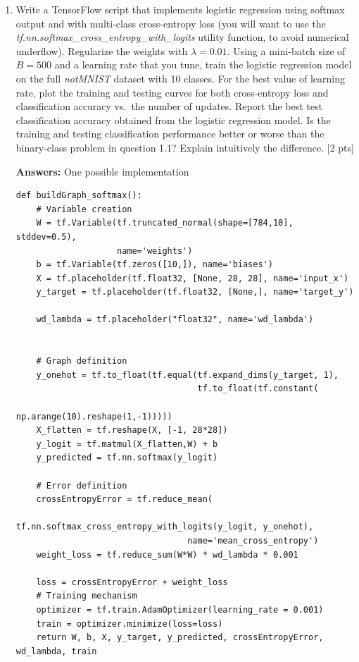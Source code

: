 \documentclass[12pt,letterpaper]{article}
\begin{document}
\begin{enumerate}
\item  Write a TensorFlow script that implements logistic regression using softmax output and with multi-class cross-entropy loss (you will want to use the \textit{tf.nn.softmax\_cross\_entropy\_with\_logits} utility function, to avoid numerical underflow). Regularize the weights with $\lambda = 0.01$. Using a mini-batch size of $B=500$ and a learning rate that you tune, train the logistic regression model on the full \textit{notMNIST} dataset with 10 classes. For the best value of learning rate, plot the training and testing curves for both cross-entropy loss and classification accuracy vs.\ the number of updates. Report the best test classification accuracy obtained from the logistic regression model. Is the training and testing classification performance better or worse than the binary-class problem in question 1.1? Explain intuitively the difference. [2 pts]

{\color{red}
  \textbf{Answers:}
  One possible implementation
}
\begin{verbatim}
def buildGraph_softmax():
    # Variable creation
    W = tf.Variable(tf.truncated_normal(shape=[784,10], stddev=0.5), 
                    name='weights')
    b = tf.Variable(tf.zeros([10,]), name='biases')
    X = tf.placeholder(tf.float32, [None, 28, 28], name='input_x')
    y_target = tf.placeholder(tf.float32, [None,], name='target_y')
    
    wd_lambda = tf.placeholder("float32", name='wd_lambda')


    # Graph definition
    y_onehot = tf.to_float(tf.equal(tf.expand_dims(y_target, 1),
                                    tf.to_float(tf.constant(
                                        np.arange(10).reshape(1,-1)))))
    X_flatten = tf.reshape(X, [-1, 28*28])
    y_logit = tf.matmul(X_flatten,W) + b
    y_predicted = tf.nn.softmax(y_logit)

    # Error definition
    crossEntropyError = tf.reduce_mean(
                        tf.nn.softmax_cross_entropy_with_logits(y_logit, y_onehot), 
                                  name='mean_cross_entropy')
    weight_loss = tf.reduce_sum(W*W) * wd_lambda * 0.001

    loss = crossEntropyError + weight_loss
    # Training mechanism
    optimizer = tf.train.AdamOptimizer(learning_rate = 0.001)
    train = optimizer.minimize(loss=loss)
    return W, b, X, y_target, y_predicted, crossEntropyError, wd_lambda, train
\end{verbatim}



\end{enumerate}
\end{document}
